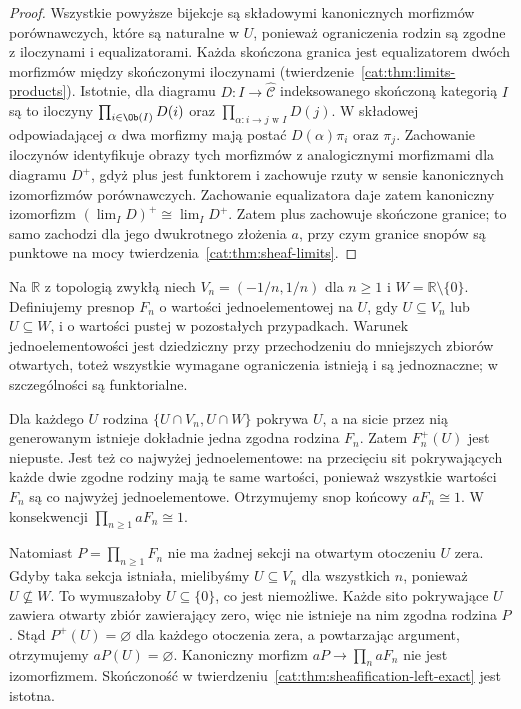\begin{proof}
Wszystkie powyższe bijekcje są składowymi kanonicznych morfizmów porównawczych, które są naturalne w $U$, ponieważ ograniczenia rodzin są zgodne z iloczynami i equalizatorami. Każda skończona granica jest equalizatorem dwóch morfizmów między skończonymi iloczynami (twierdzenie~\ref{cat:thm:limits-products}). Istotnie, dla diagramu $D:I\to\widehat{\mathcal C}$ indeksowanego skończoną kategorią $I$ są to iloczyny $\prod_{i\in\Ob(I)}D(i)$ oraz $\prod_{\alpha:i\to j\text{ w }I}D(j)$. W składowej odpowiadającej $\alpha$ dwa morfizmy mają postać $D(\alpha)\pi_i$ oraz $\pi_j$. Zachowanie iloczynów identyfikuje obrazy tych morfizmów z analogicznymi morfizmami dla diagramu $D^+$, gdyż plus jest funktorem i zachowuje rzuty w sensie kanonicznych izomorfizmów porównawczych. Zachowanie equalizatora daje zatem kanoniczny izomorfizm $(\lim_I D)^+\cong\lim_I D^+$. Zatem plus zachowuje skończone granice; to samo zachodzi dla jego dwukrotnego złożenia $a$, przy czym granice snopów są punktowe na mocy twierdzenia~\ref{cat:thm:sheaf-limits}.
\end{proof}

\begin{przyklad}\label{cat:ex:sheafification-infinite-products}
Na $\mathbb R$ z topologią zwykłą niech $V_n=(-1/n,1/n)$ dla $n\geq 1$ i $W=\mathbb R\setminus\{0\}$. Definiujemy presnop $F_n$ o wartości jednoelementowej na $U$, gdy $U\subseteq V_n$ lub $U\subseteq W$, i o wartości pustej w pozostałych przypadkach. Warunek jednoelementowości jest dziedziczny przy przechodzeniu do mniejszych zbiorów otwartych, toteż wszystkie wymagane ograniczenia istnieją i są jednoznaczne; w szczególności są funktorialne.

Dla każdego $U$ rodzina $\{U\cap V_n,U\cap W\}$ pokrywa $U$, a na sicie przez nią generowanym istnieje dokładnie jedna zgodna rodzina $F_n$. Zatem $F_n^+(U)$ jest niepuste. Jest też co najwyżej jednoelementowe: na przecięciu sit pokrywających każde dwie zgodne rodziny mają te same wartości, ponieważ wszystkie wartości $F_n$ są co najwyżej jednoelementowe. Otrzymujemy snop końcowy $aF_n\cong 1$. W konsekwencji $\prod_{n\geq 1}aF_n\cong 1$.

Natomiast $P=\prod_{n\geq 1}F_n$ nie ma żadnej sekcji na otwartym otoczeniu $U$ zera. Gdyby taka sekcja istniała, mielibyśmy $U\subseteq V_n$ dla wszystkich $n$, ponieważ $U\not\subseteq W$. To wymuszałoby $U\subseteq\{0\}$, co jest niemożliwe. Każde sito pokrywające $U$ zawiera otwarty zbiór zawierający zero, więc nie istnieje na nim zgodna rodzina $P$. Stąd $P^+(U)=\varnothing$ dla każdego otoczenia zera, a powtarzając argument, otrzymujemy $aP(U)=\varnothing$. Kanoniczny morfizm $aP\to\prod_n aF_n$ nie jest izomorfizmem. Skończoność w twierdzeniu~\ref{cat:thm:sheafification-left-exact} jest istotna.
\end{przyklad}

